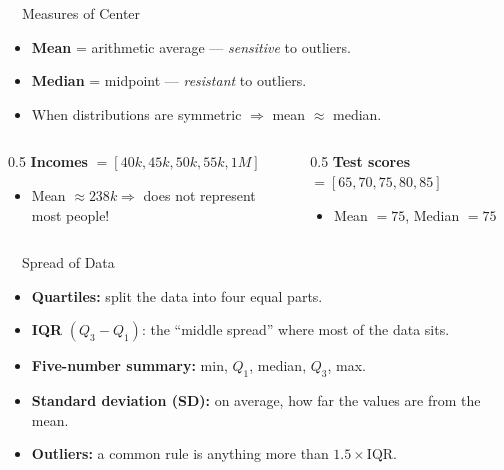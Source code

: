 \documentclass[aspectratio=169,11pt]{beamer}
\begin{document}
\begin{frame}{\ \ Measures of Center}
  \begin{keybox}
    \begin{itemize}
      \item \textbf{Mean} = arithmetic average --- \emph{sensitive} to outliers.
      \item \textbf{Median} = midpoint --- \emph{resistant} to outliers.
      \item When distributions are symmetric $\Rightarrow$ mean $\approx$ median.
    \end{itemize}
  \end{keybox}
  \vspace{0.5em}
  \begin{columns}[T]
    \begin{column}{0.5\textwidth}
      \textbf{\color{qrnavy}Incomes} $= [40k, 45k, 50k, 55k, 1M]$
      \begin{itemize}
        \item Mean $\approx 238k \Rightarrow$ does not represent most people!
      \end{itemize}
    \end{column}
    \begin{column}{0.5\textwidth}
      \textbf{\color{qrnavy}Test scores} $= [65, 70, 75, 80, 85]$
      \begin{itemize}
        \item Mean $= 75$, \quad Median $= 75$
      \end{itemize}
    \end{column}
  \end{columns}
\end{frame}

\begin{frame}{\ \ Spread of Data}
  \begin{itemize}
    \item \textbf{Quartiles:} split the data into four equal parts.
    \item \textbf{IQR} $(Q_3 - Q_1)$: the ``middle spread'' where most of the data sits.
    \item \textbf{Five-number summary:} min, $Q_1$, median, $Q_3$, max.
    \item \textbf{Standard deviation (SD):} on average, how far the values are from the mean.
    \item \textbf{Outliers:} a common rule is anything more than $1.5 \times \text{IQR}$.
  \end{itemize}
\end{frame}
\end{document}
